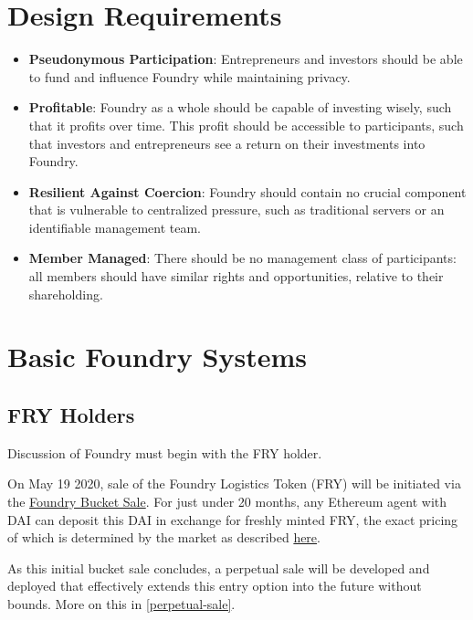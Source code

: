 \documentclass{article}
\begin{document}
\section{Design Requirements} \label{design-requirements}

\begin{itemize}

\item \textbf{Pseudonymous Participation}: Entrepreneurs and investors should be able to fund and influence Foundry while maintaining privacy.

\item \textbf{Profitable}: Foundry as a whole should be capable of investing wisely, such that it profits over time. This profit should be accessible to participants, such that investors and entrepreneurs see a return on their investments into Foundry.

\item \textbf{Resilient Against Coercion}: Foundry should contain no crucial component that is vulnerable to centralized pressure, such as traditional servers or an identifiable management team.

\item \textbf{Member Managed}: There should be no management class of participants: all members should have similar rights and opportunities, relative to their shareholding.

\end{itemize}

\section{Basic Foundry Systems} \label{basic}

\subsection{FRY Holders} \label{fry-holders}

Discussion of Foundry must begin with the FRY holder.

On May 19 2020, sale of the Foundry Logistics Token (FRY) will be initiated via the \href{https://foundrydao.com/faq/#about-the-token-sale}{Foundry Bucket Sale}. For just under 20 months, any Ethereum agent with DAI can deposit this DAI in exchange for freshly minted FRY, the exact pricing of which is determined by the market as described \href{https://foundrydao.com/faq/#how-much-is-the-sale-looking-to-raise}{here}.

As this initial bucket sale concludes, a perpetual sale will be developed and deployed that effectively extends this entry option into the future without bounds. More on this in \ref{perpetual-sale}.
\end{document}
